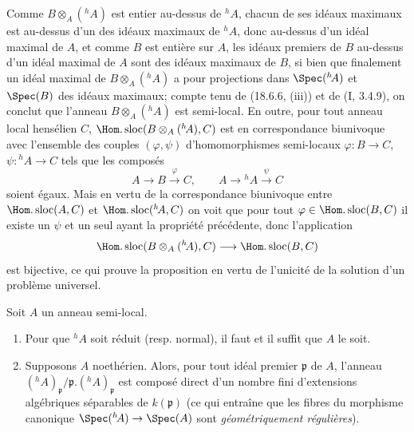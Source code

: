 Comme $B\otimes_A({}^h\!A)$ est entier au-dessus de ${}^h\!A$, chacun de ses idéaux maximaux est au-dessus d'un des idéaux maximaux de ${}^h\!A$, donc au-dessus d'un idéal maximal de $A$, et comme $B$ est entière sur $A$, les idéaux premiers de $B$ au-dessus d'un idéal maximal de $A$ sont des idéaux maximaux de $B$, si bien que finalement un idéal maximal de $B\otimes_A({}^h\!A)$ a pour projections dans $\Spec({}^h\!A)$ et $\Spec(B)$ des idéaux maximaux; compte tenu de (18.6.6, (iii)) et de (I, 3.4.9), on conclut que l'anneau $B\otimes_A({}^h\!A)$ est semi-local. En outre, pour tout anneau local hensélien $C$, $\Hom.\operatorname{sloc}(B\otimes_A({}^h\!A),C)$ est en correspondance biunivoque avec l'ensemble des couples $(\varphi,\psi)$ d'homomorphismes semi-locaux $\varphi:B\to C$, $\psi:{}^h\!A\to C$ tels que les composés
\[
  A\longrightarrow B\xrightarrow{\varphi}C,\qquad
  A\longrightarrow{}^h\!A\xrightarrow{\psi}C
\]
soient égaux. Mais en vertu de la correspondance biunivoque entre $\Hom.\operatorname{sloc}(A,C)$ et $\Hom.\operatorname{sloc}({}^h\!A,C)$ on voit que pour tout $\varphi\in\Hom.\operatorname{sloc}(B,C)$ il existe un $\psi$ et un seul ayant la propriété précédente, donc l'application
\[
  \Hom.\operatorname{sloc}(B\otimes_A({}^h\!A),C)\longrightarrow\Hom.\operatorname{sloc}(B,C)
\]
est bijective, ce qui prouve la proposition en vertu de l'unicité de la solution d'un problème universel.

\begin{theorem}[18.6.9]
\label{IV.18.6.9}
Soit $A$ un anneau semi-local.
\begin{enumerate}
  \item[(i)] Pour que ${}^h\!A$ soit réduit (resp. normal), il faut et il suffit que $A$ le soit.
  \item[(ii)] Supposons $A$ noethérien. Alors, pour tout idéal premier $\mathfrak p$ de $A$, l'anneau $({}^h\!A)_{\mathfrak p}/\mathfrak p.({}^h\!A)_{\mathfrak p}$ est composé direct d'un nombre fini d'extensions algébriques séparables de $k(\mathfrak p)$ (ce qui entraîne que les fibres du morphisme canonique $\Spec({}^h\!A)\to\Spec(A)$ sont \emph{géométriquement régulières}).
\end{enumerate}
\end{theorem}

